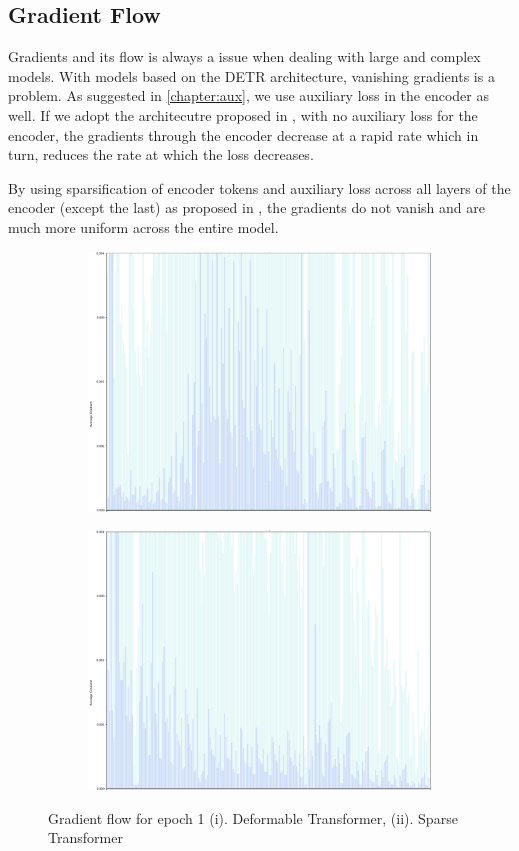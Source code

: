 \subsection{Gradient Flow}

\par Gradients and its flow is always a issue when dealing with large and complex models. With models based on the DETR \cite{carion2020detr} architecture, vanishing gradients is a problem. As suggested in \ref{chapter:aux}, we use auxiliary loss in the encoder as well. If we adopt the architecutre proposed in \cite{zhu2020deformable}, with no auxiliary loss for the encoder, the gradients through the encoder decrease at a rapid rate which in turn, reduces the rate at which the loss decreases. 
\par By using sparsification of encoder tokens and auxiliary loss across all layers of the encoder (except the last) as proposed in \cite{roh2021sparse}, the gradients do not vanish and are much more uniform across the entire model.

\begin{figure}[h]
	\centering
	\begin{subfigure}[b]{0.55\textwidth}
		\includegraphics[width=0.8\linewidth]{assets/img/deformable_grad_flow_epoch_1.png}
	\end{subfigure}%
	\begin{subfigure}[b]{0.55\textwidth}
		\includegraphics[width=0.8\linewidth]{assets/img/sparse_grad_flow_epoch_1.png}
	\end{subfigure}
	\caption{Gradient flow for epoch 1 (i). Deformable Transformer, (ii). Sparse Transformer}
	
	\label{fig:gradientflowepoch1}
\end{figure}

